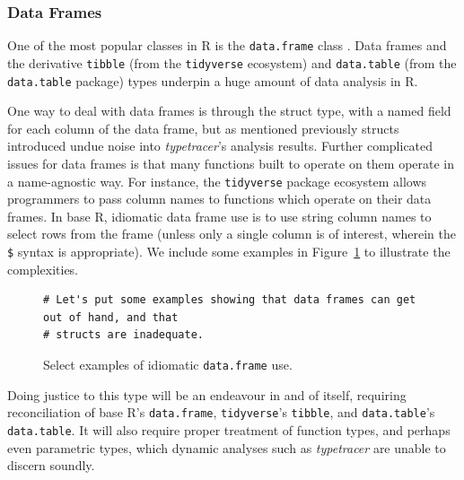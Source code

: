 \documentclass[acmsmall,review,anonymous]{acmart}\settopmatter{printfolios=true,printccs=false,printacmref=false}
\newcommand{\code}[1]{{\lstinline[style=Rin]!#1!}\xspace}
\newcommand{\typetracer}{\emph{typetracer}\xspace} %
\begin{document}
%
%
\subsubsection{Data Frames}

One of the most popular classes in R is the \code{data.frame} class .
Data frames and the derivative \code{tibble} (from the \code{tidyverse} ecosystem) and \code{data.table} (from the \code{data.table} package) types underpin a huge amount of data analysis in R.

One way to deal with data frames is through the struct type, with a named field for each column of the data frame, but as mentioned previously structs introduced undue noise into \typetracer's analysis results. 
Further complicated issues for data frames is that many functions built to operate on them operate in a name-agnostic way.
For instance, the \code{tidyverse} package ecosystem allows programmers to pass column names to functions which operate on their data frames.
In base R, idiomatic data frame use is to use string column names to select rows from the frame (unless only a single column is of interest, wherein the \code{$} syntax is appropriate). 
We include some examples in Figure~\ref{fig:data-frames-bad} to illustrate the complexities.

\begin{figure}[htbp]
\begin{center}

\begin{lstlisting}
# Let's put some examples showing that data frames can get out of hand, and that
# structs are inadequate.
\end{lstlisting}

\caption{Select examples of idiomatic \code{data.frame} use.}
\label{fig:data-frames-bad}
\end{center}
\end{figure}

Doing justice to this type will be an endeavour in and of itself, requiring reconciliation of base R's \code{data.frame}, \code{tidyverse}'s \code{tibble}, and \code{data.table}'s \code{data.table}.
It will also require proper treatment of function types, and perhaps even parametric types, which dynamic analyses such as \typetracer are unable to discern soundly.
\end{document}
